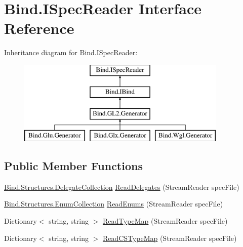 \hypertarget{interface_bind_1_1_i_spec_reader}{
\section{Bind.ISpecReader Interface Reference}
\label{interface_bind_1_1_i_spec_reader}
}
Inheritance diagram for Bind.ISpecReader:\begin{figure}[H]
\begin{center}
\leavevmode
\includegraphics[height=4.000000cm]{interface_bind_1_1_i_spec_reader}
\end{center}
\end{figure}
\subsection*{Public Member Functions}
\begin{DoxyCompactItemize}
\item 
\hyperlink{class_bind_1_1_structures_1_1_delegate_collection}{Bind.Structures.DelegateCollection} \hyperlink{interface_bind_1_1_i_spec_reader_a12d7a318382146d5d1c867a838123c15}{ReadDelegates} (StreamReader specFile)
\item 
\hyperlink{class_bind_1_1_structures_1_1_enum_collection}{Bind.Structures.EnumCollection} \hyperlink{interface_bind_1_1_i_spec_reader_a1672dccb9afdd8e73bceeabc7abfad37}{ReadEnums} (StreamReader specFile)
\item 
Dictionary$<$ string, string $>$ \hyperlink{interface_bind_1_1_i_spec_reader_a51062433d2e07c0d6c540046239710c1}{ReadTypeMap} (StreamReader specFile)
\item 
Dictionary$<$ string, string $>$ \hyperlink{interface_bind_1_1_i_spec_reader_acfe72df6fdf83476d55e94d9d279be70}{ReadCSTypeMap} (StreamReader specFile)
\end{DoxyCompactItemize}



